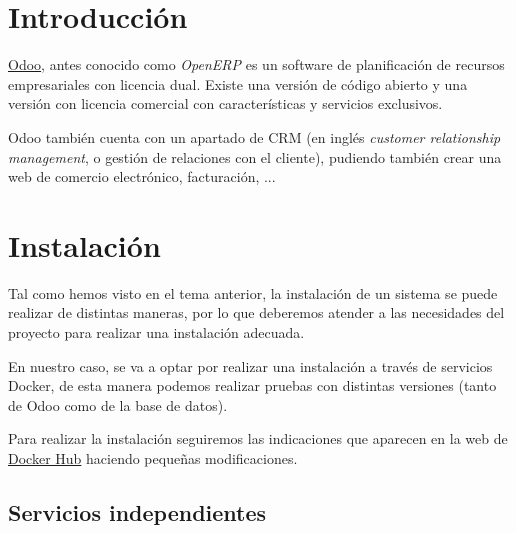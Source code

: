 \chapter{Introducción}
\href{https://es.wikipedia.org/wiki/Odoo}{Odoo}, antes conocido como \textit{OpenERP} es un software de planificación de recursos empresariales con licencia dual. Existe una versión de código abierto y una versión con licencia comercial con características y servicios exclusivos.

Odoo también cuenta con un apartado de CRM (en inglés \textit{customer relationship management}, o gestión de relaciones con el cliente), pudiendo también crear una web de comercio electrónico, facturación, ...


\chapter{Instalación}

Tal como hemos visto en el tema anterior, la instalación de un sistema se puede realizar de distintas maneras, por lo que deberemos atender a las necesidades del proyecto para realizar una instalación adecuada.

En nuestro caso, se va a optar por realizar una instalación a través de servicios Docker, de esta manera podemos realizar pruebas con distintas versiones (tanto de Odoo como de la base de datos).


Para realizar la instalación seguiremos las indicaciones que aparecen en la web de \href{https://hub.docker.com/_/odoo}{Docker Hub} haciendo pequeñas modificaciones.

\section{Servicios independientes}

